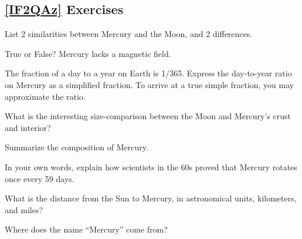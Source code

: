 \documentclass{article}
\numberwithin{equation}{section}
\numberwithin{figure}{section}
\begin{document}
\subsection*{\ref{IF2QAz} Exercises}

\begin{exercise}
    List 2 similarities between Mercury and the Moon, and 2 differences.
\end{exercise}

\begin{exercise}
    True or False? Mercury lacks a magnetic field.
\end{exercise}

\begin{exercise}
The fraction of a day to a year on Earth is 1/365. Express the day-to-year ratio on Mercury as a simplified fraction.  To arrive at a true simple fraction, you may approximate the ratio.
\end{exercise}

\begin{exercise}
    What is the interesting size-comparison between the Moon and Mercury's crust and interior?
\end{exercise}

\begin{exercise}
    Summarize the composition of Mercury.
\end{exercise}

\begin{exercise}
    In your own words, explain how scientists in the 60s proved that Mercury rotates once every 59 days.
\end{exercise}

\begin{exercise}
    What is the distance from the Sun to Mercury, in astronomical units, kilometers, and miles?
\end{exercise}

\begin{exercise}
    Where does the name ``Mercury'' come from?
\end{exercise}

\clearpage


\end{document}
